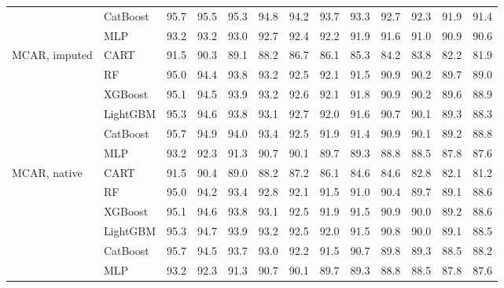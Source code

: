\documentclass[pdflatex,sn-mathphys]{sn-jnl}
\theoremstyle{thmstyleone}
\begin{document}
\begin{table}[htbp]
\begin{tabular}{@{}llrrrrrrrrrrr@{}}
 & CatBoost & 95.7 & 95.5 & 95.3 & 94.8 & 94.2 & 93.7 & 93.3 & 92.7 & 92.3 & 91.9 & 91.4 \\
 & MLP & 93.2 & 93.2 & 93.0 & 92.7 & 92.4 & 92.2 & 91.9 & 91.6 & 91.0 & 90.9 & 90.6 \\
\midrule
MCAR, imputed & CART & 91.5 & 90.3 & 89.1 & 88.2 & 86.7 & 86.1 & 85.3 & 84.2 & 83.8 & 82.2 & 81.9 \\
 & RF & 95.0 & 94.4 & 93.8 & 93.2 & 92.5 & 92.1 & 91.5 & 90.9 & 90.2 & 89.7 & 89.0 \\
 & XGBoost & 95.1 & 94.5 & 93.9 & 93.2 & 92.6 & 92.1 & 91.8 & 90.9 & 90.2 & 89.6 & 88.9 \\
 & LightGBM & 95.3 & 94.6 & 93.8 & 93.1 & 92.7 & 92.0 & 91.6 & 90.7 & 90.1 & 89.3 & 88.3 \\
 & CatBoost & 95.7 & 94.9 & 94.0 & 93.4 & 92.5 & 91.9 & 91.4 & 90.9 & 90.1 & 89.2 & 88.8 \\
 & MLP & 93.2 & 92.3 & 91.3 & 90.7 & 90.1 & 89.7 & 89.3 & 88.8 & 88.5 & 87.8 & 87.6 \\
\midrule
MCAR, native & CART & 91.5 & 90.4 & 89.0 & 88.2 & 87.2 & 86.1 & 84.6 & 84.6 & 82.8 & 82.1 & 81.2 \\
 & RF & 95.0 & 94.2 & 93.4 & 92.8 & 92.1 & 91.5 & 91.0 & 90.4 & 89.7 & 89.1 & 88.6 \\
 & XGBoost & 95.1 & 94.6 & 93.8 & 93.1 & 92.5 & 91.9 & 91.5 & 90.9 & 90.0 & 89.2 & 88.6 \\
 & LightGBM & 95.3 & 94.7 & 93.9 & 93.2 & 92.5 & 92.0 & 91.5 & 90.8 & 90.0 & 89.1 & 88.5 \\
 & CatBoost & 95.7 & 94.5 & 93.7 & 93.0 & 92.2 & 91.5 & 90.7 & 89.8 & 89.3 & 88.5 & 88.2 \\
 & MLP & 93.2 & 92.3 & 91.3 & 90.7 & 90.1 & 89.7 & 89.3 & 88.8 & 88.5 & 87.8 & 87.6 \\
\bottomrule
\end{tabular}
\end{table}
\end{document}
